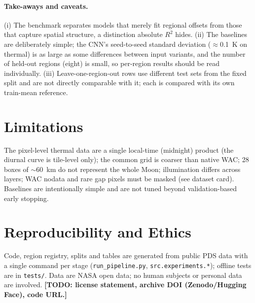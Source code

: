 \documentclass[10pt]{article}
\newcommand{\TODO}[1]{\textbf{[TODO: #1]}}
\begin{document}
\paragraph{Take-aways and caveats.}
(i) The benchmark separates models that merely fit regional offsets from those
that capture spatial structure, a distinction absolute $R^2$ hides. (ii) The
baselines are deliberately simple; the CNN's seed-to-seed standard deviation
($\approx$0.1~K on thermal) is as large as some differences between input
variants, and the number of held-out regions (eight) is small, so
per-region results should be read individually. (iii) Leave-one-region-out
rows use different test sets from the fixed split and are not directly
comparable with it; each is compared with its own train-mean reference.

\section{Limitations}
The pixel-level thermal data are a single local-time (midnight) product (the
diurnal curve is tile-level only); the common grid is
coarser than native WAC; 28 boxes of $\sim$60~km do not represent the whole
Moon; illumination differs across layers; WAC nodata and rare gap pixels must
be masked (see dataset card). Baselines are intentionally simple and are not
tuned beyond validation-based early stopping.

\section{Reproducibility and Ethics}
Code, region registry, splits and tables are generated from public PDS data
with a single command per stage (\texttt{run\_pipeline.py},
\texttt{src.experiments.*}); offline tests are in \texttt{tests/}. Data are
NASA open data; no human subjects or personal data are involved.
\TODO{license statement, archive DOI (Zenodo/Hugging Face), code URL.}



\end{document}
